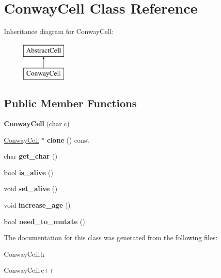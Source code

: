 \hypertarget{classConwayCell}{\section{\-Conway\-Cell \-Class \-Reference}
\label{classConwayCell}
}
\-Inheritance diagram for \-Conway\-Cell\-:\begin{figure}[H]
\begin{center}
\leavevmode
\includegraphics[height=2.000000cm]{classConwayCell}
\end{center}
\end{figure}
\subsection*{\-Public \-Member \-Functions}
\begin{DoxyCompactItemize}
\item 
\hypertarget{classConwayCell_a928722d93df06ed5632c2fd6e36228d6}{{\bfseries \-Conway\-Cell} (char c)}\label{classConwayCell_a928722d93df06ed5632c2fd6e36228d6}

\item 
\hypertarget{classConwayCell_a0fac73dc33d36053d1400430f1c980ce}{\hyperlink{classConwayCell}{\-Conway\-Cell} $\ast$ {\bfseries clone} () const }\label{classConwayCell_a0fac73dc33d36053d1400430f1c980ce}

\item 
\hypertarget{classConwayCell_a67de36a1df8919d43a20a54427596b13}{char {\bfseries get\-\_\-char} ()}\label{classConwayCell_a67de36a1df8919d43a20a54427596b13}

\item 
\hypertarget{classConwayCell_a595428d5ac3cdc6acb682402a5ab0737}{bool {\bfseries is\-\_\-alive} ()}\label{classConwayCell_a595428d5ac3cdc6acb682402a5ab0737}

\item 
\hypertarget{classConwayCell_af6d654724f9be886687847bae22886b7}{void {\bfseries set\-\_\-alive} ()}\label{classConwayCell_af6d654724f9be886687847bae22886b7}

\item 
\hypertarget{classConwayCell_a45cadbc5998edfae3a29f8b7f110fac8}{void {\bfseries increase\-\_\-age} ()}\label{classConwayCell_a45cadbc5998edfae3a29f8b7f110fac8}

\item 
\hypertarget{classConwayCell_a716abbf4415786c527ce56305fda14f7}{bool {\bfseries need\-\_\-to\-\_\-mutate} ()}\label{classConwayCell_a716abbf4415786c527ce56305fda14f7}

\end{DoxyCompactItemize}


\-The documentation for this class was generated from the following files\-:\begin{DoxyCompactItemize}
\item 
\-Conway\-Cell.\-h\item 
\-Conway\-Cell.\-c++\end{DoxyCompactItemize}
